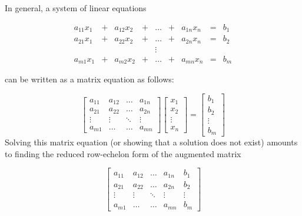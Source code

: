 \documentclass{ximera}
\begin{document}
In general, a system of linear equations

$$\begin{array}{ccccccccc}
      a_{11}x_1 &+ &a_{12}x_2&+&\ldots&+&a_{1n}x_n&= &b_1 \\
	 a_{21}x_1 &+ &a_{22}x_2&+&\ldots&+&a_{2n}x_n&= &b_2 \\
     &&&&\vdots&&&& \\
     a_{m1}x_1 &+ &a_{m2}x_2&+&\ldots&+&a_{mn}x_n&= &b_m
    \end{array}$$

can be written as a matrix equation as follows:

$$
 \begin{bmatrix}
           a_{11} & a_{12}&\dots&a_{1n}\\
           a_{21}&a_{22} &\dots &a_{2n}\\
		\vdots & \vdots&\ddots &\vdots\\
		a_{m1}&\dots &\dots &a_{mn}
         \end{bmatrix}
		\begin{bmatrix}
           x_1\\
           x_2\\
		\vdots \\
		x_n
         \end{bmatrix} = \begin{bmatrix}
           b_1\\
           b_2\\
		\vdots \\
		b_m
        \end{bmatrix}
$$
Solving this matrix equation (or showing that a solution does not exist) amounts to finding the reduced row-echelon form  of the augmented matrix

$$\left[\begin{array}{cccc|c}  
 a_{11} & a_{12}&\dots&a_{1n}&b_1\\
           a_{21}&a_{22} &\dots &a_{2n}&b_2\\
		\vdots & \vdots&\ddots &\vdots&\vdots\\
		a_{m1}&\dots &\dots &a_{mn}&b_m
 \end{array}\right]$$
\end{document}
